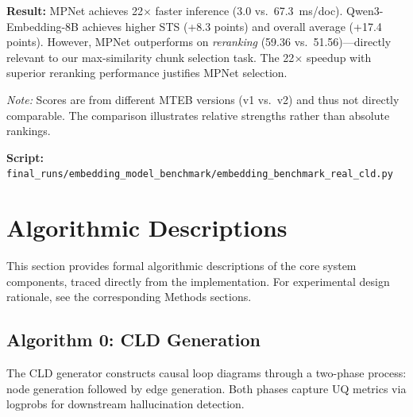 \textbf{Result:} MPNet achieves 22$\times$ faster inference (3.0 vs.\ 67.3~ms/doc). Qwen3-Embedding-8B achieves higher STS (+8.3 points) and overall average (+17.4 points). However, MPNet outperforms on \textit{reranking} (59.36 vs.\ 51.56)---directly relevant to our max-similarity chunk selection task. The 22$\times$ speedup with superior reranking performance justifies MPNet selection.

\textit{Note:} Scores are from different MTEB versions (v1 vs.\ v2) and thus not directly comparable. The comparison illustrates relative strengths rather than absolute rankings.

\textbf{Script:} \texttt{final\_runs/embedding\_model\_benchmark/embedding\_benchmark\_real\_cld.py}

\section{Algorithmic Descriptions}
\label{sec:algorithms}

This section provides formal algorithmic descriptions of the core system components, traced directly from the implementation. For experimental design rationale, see the corresponding Methods sections.

\subsection{Algorithm 0: CLD Generation}
\label{alg:cld_generation}

The CLD generator constructs causal loop diagrams through a two-phase process: node generation followed by edge generation. Both phases capture UQ metrics via logprobs for downstream hallucination detection.

